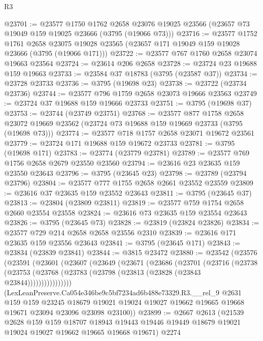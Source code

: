 \begin{lexlean}{R3}
\begin{coremodule}
@23701 := @23577
    @1750
    @1762
    @2658
    @23076
    @19025
    @23566
    (@23657 @73 @19049 @159 @19025 @23666 (@3795 (@19066 @73)))
@23716 := @23577
    @1752
    @1761
    @2658
    @23075
    @19028
    @23565
    (@23657 @171 @19049 @159 @19028 @23666 (@3795 (@19066 @171)))
@23722 := @23577 @767 @1760 @2658 @23074 @19663 @23564
@23724 := @23614 @206 @2658
@23728 := @23724 @23 @19688 @159 @19663
@23733 := @23584 @37 @18783 (@3795 (@23587 @37))
@23734 := @23728 @23733
@23736 := @3795 (@19698 @23)
@23738 := @23722 (@23734 @23736)
@23744 := @23577 @796 @1759 @2658 @23073 @19666 @23563
@23749 := @23724 @37 @19688 @159 @19666 @23733
@23751 := @3795 (@19698 @37)
@23753 := @23744 (@23749 @23751)
@23768 := @23577
    @877
    @1758
    @2658
    @23072
    @19669
    @23562
    (@23724 @73 @19688 @159 @19669 @23733 (@3795 (@19698 @73)))
@23774 := @23577 @718 @1757 @2658 @23071 @19672 @23561
@23779 := @23724 @171 @19688 @159 @19672 @23733
@23781 := @3795 (@19698 @171)
@23783 := @23774 (@23779 @23781)
@23789 := @23577 @769 @1756 @2658 @2679 @23550 @23560
@23794 := @23616 @23 @23635 @159 @23550 @23643
@23796 := @3795 (@23645 @23)
@23798 := @23789 (@23794 @23796)
@23804 := @23577 @777 @1755 @2658 @2661 @23552 @23559
@23809 := @23616 @37 @23635 @159 @23552 @23643
@23811 := @3795 (@23645 @37)
@23813 := @23804 (@23809 @23811)
@23819 := @23577 @759 @1754 @2658 @2660 @23554 @23558
@23824 := @23616 @73 @23635 @159 @23554 @23643
@23826 := @3795 (@23645 @73)
@23828 := @23819 (@23824 @23826)
@23834 := @23577 @729 @214 @2658 @2658 @23556 @2310
@23839 := @23616 @171 @23635 @159 @23556 @23643
@23841 := @3795 (@23645 @171)
@23843 := @23834 (@23839 @23841)
@23844 := @3815 @23472
@23880 := @23542
    (@23576
      (@23591
        (@23601
          (@23607
            (@23649
              (@23671
                (@23686
                  (@23701
                    (@23716
                      (@23738
                        (@23753
                          (@23768 (@23783 (@23798 (@23813 (@23828 (@23843 @23844))))))))))))))))
      (LexLeanPreserve.Ca054e346be9c5bf7234ad6b488e73329.R3.__rel_9
        @2631
        @159
        @159
        @23245
        @18679
        @19021
        @19024
        @19027
        @19662
        @19665
        @19668
        @19671
        @23094
        @23096
        @23098
        @23100))
@23899 := @2667
    @2613
    (@21539
      @2628
      @159
      @159
      @18707
      @18943
      @19443
      @19446
      @19449
      @18679
      @19021
      @19024
      @19027
      @19662
      @19665
      @19668
      @19671)
    @2274

\end{coremodule}
\end{lexlean}
